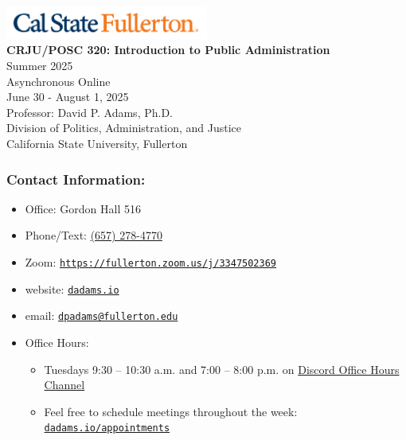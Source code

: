 \documentclass[11pt, letterpaper]{article}
\begin{document}
\begin{center}
    \includegraphics[width=0.5\textwidth]{csuf_logo.png}\\[1em]
    {\LARGE\bfseries CRJU/POSC 320: Introduction to Public Administration}\\[0.5em]
    {\large Summer 2025}\\
    {\small Asynchronous Online}\\
    {June 30 - August 1, 2025}\\[1em]
    {\large Professor: David P. Adams, Ph.D.}\\[0.25em]
    {\small Division of Politics, Administration, and Justice}\\
    {California State University, Fullerton}
\end{center}

\vspace{1em}


\subsubsection*{Contact Information:}

\begin{itemize}
    \item Office: Gordon Hall 516
    \item Phone/Text: \href{tel:+16572784770}{(657) 278-4770}
    \item Zoom: \href{https://fullerton.zoom.us/j/3347502369}{\texttt{https://fullerton.zoom.us/j/3347502369}}
    \item website: \href{https://dadams.io}{\texttt{dadams.io}}
    \item email: \href{mailto:dpadams@fullerton.edu}{\texttt{dpadams@fullerton.edu}}
    \item Office Hours:
        \begin{itemize}
            \item Tuesdays 9:30 -- 10:30 a.m. and 7:00 -- 8:00 p.m. on \href{https://discord.com/channels/1128747433636135113/1154048074172354600}{Discord Office Hours Channel}
            \item Feel free to schedule meetings throughout the week: \href{https://dadams.io/appointments}{\texttt{dadams.io/appointments}}
        \end{itemize}  
\end{itemize}
\end{document}
